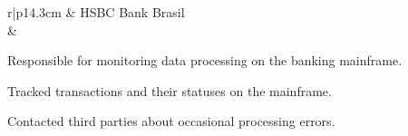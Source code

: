 \documentclass[a4paper,11pt]{article}
\begin{document}
\begin{tabular}{r|p{14.3cm}}
 & HSBC Bank Brasil \\
 &\footnotesize{
    \begin{itemize*}[label=\textbullet]
        \item Responsible for monitoring data processing on the banking mainframe.
        \item Tracked transactions and their statuses on the mainframe.
        \item Contacted third parties about occasional processing errors.
    \end{itemize*}
 }
 \\ \\


\end{tabular}

\end{document}
